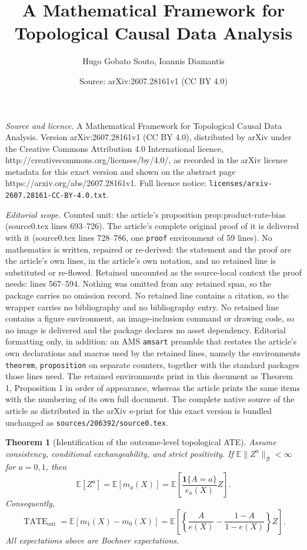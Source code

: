 \documentclass[10pt,a4paper]{amsart}
\title{A Mathematical Framework for Topological Causal Data Analysis}
\author{Hugo Gobato Souto, Ioannis Diamantis}
\date{Source: arXiv:2607.28161v1 (CC BY 4.0)}
\newtheorem{theorem}{Theorem}
\begin{document}
\maketitle

\noindent\emph{Source and licence.} A Mathematical Framework for Topological Causal Data Analysis. Version arXiv:2607.28161v1 (CC BY 4.0), distributed by arXiv under the Creative Commons Attribution 4.0 International licence, http://creativecommons.org/licenses/by/4.0/, as recorded in the arXiv licence metadata for this exact version and shown on the abstract page https://arxiv.org/abs/2607.28161v1. Full licence notice: \texttt{licenses/arxiv-2607.28161-CC-BY-4.0.txt}.\par\smallskip

\noindent\textit{Editorial scope.} Counted unit: the article's proposition prop:product-rate-bias (source0.tex lines 693--726). The article's complete original proof of it is delivered with it (source0.tex lines 728--786, one \texttt{proof} environment of 59 lines). No mathematics is written, repaired or re-derived: the statement and the proof are the article's own lines, in the article's own notation, and no retained line is substituted or re-flowed.  Retained uncounted as the source-local context the proof needs: lines 567--594.  Nothing was omitted from any retained span, so the package carries no omission record.  No retained line contains a citation, so the wrapper carries no bibliography and no bibliography entry.  No retained line contains a figure environment, an image-inclusion command or drawing code, so no image is delivered and the package declares no asset dependency.  Editorial formatting only, in addition: an AMS \texttt{amsart} preamble that restates the article's own declarations and macros used by the retained lines, namely the environments \texttt{theorem}, \texttt{proposition} on separate counters, together with the standard packages those lines need.  The retained environments print in this document as Theorem 1, Proposition 1 in order of appearance, whereas the article prints the same items with the numbering of its own full document.  The complete native source of the article as distributed in the arXiv e-print for this exact version is bundled unchanged as \texttt{sources/206392/source0.tex}.
\begin{theorem}[Identification of the outcome-level topological ATE]
\label{thm:identification-outcome-tate}
Assume consistency, conditional exchangeability, and strict positivity. If \(\mathbb E\|Z^a\|_{\mathcal B}<\infty\) for \(a=0,1\), then
\[
\mathbb E[Z^a]
=
\mathbb E[m_a(X)]
=
\mathbb E\left[
\frac{\mathbf 1\{A=a\}}{e_a(X)}Z
\right].
\]
Consequently,
\[
\operatorname{TATE}_{\mathrm{out}}
=
\mathbb E[m_1(X)-m_0(X)]
=
\mathbb E\left[
\left\{
\frac{A}{e(X)}
-
\frac{1-A}{1-e(X)}
\right\}Z
\right].
\]
All expectations above are Bochner expectations.
\end{theorem}
\end{document}
